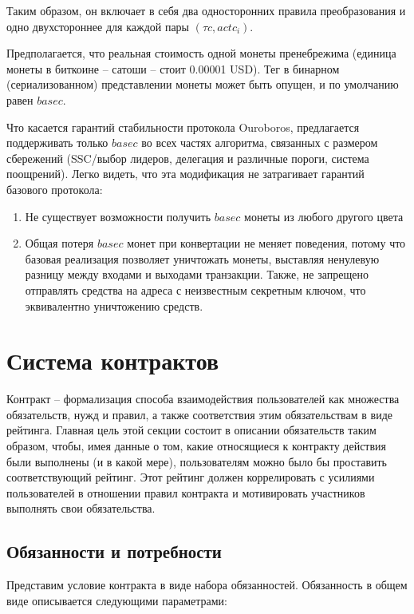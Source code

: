 \documentclass[specification,annotation]{itmo-student-thesis}
\begin{document}
Таким образом, он включает в себя два односторонних правила
преобразования и одно двухстороннее для каждой пары $(\tau c, actc_i)$.

Предполагается, что реальная стоимость одной монеты пренебрежима
(единица монеты в биткоине -- сатоши -- стоит 0.00001 USD). Тег в
бинарном (сериализованном) представлении монеты может быть опущен, и
по умолчанию равен $basec$.

Что касается гарантий стабильности протокола Ouroboros, предлагается
поддерживать только $basec$ во всех частях алгоритма, связанных с
размером сбережений (SSC/выбор лидеров, делегация и различные пороги,
система поощрений). Легко видеть, что эта модификация не затрагивает
гарантий базового протокола:

\begin{enumerate}
\item Не существует возможности получить $basec$ монеты из любого
  другого цвета
\item Общая потеря $basec$ монет при конвертации не меняет поведения,
  потому что базовая реализация позволяет уничтожать монеты, выставляя
  ненулевую разницу между входами и выходами транзакции. Также, не
  запрещено отправлять средства на адреса с неизвестным секретным
  ключом, что эквивалентно уничтожению средств.
\end{enumerate}

\section{Система контрактов}

Контракт -- формализация способа взаимодействия пользователей как
множества обязательств, нужд и правил, а также соответствия этим
обязательствам в виде рейтинга. Главная цель этой секции состоит в
описании обязательств таким образом, чтобы, имея данные о том, какие
относящиеся к контракту действия были выполнены (и в какой мере),
пользователям можно было бы проставить соответствующий рейтинг. Этот
рейтинг должен коррелировать с усилиями пользователей в отношении
правил контракта и мотивировать участников выполнять свои
обязательства.

\subsection{Обязанности и потребности}

Представим условие контракта в виде набора обязанностей. Обязанность в
общем виде описывается следующими параметрами:
\end{document}
